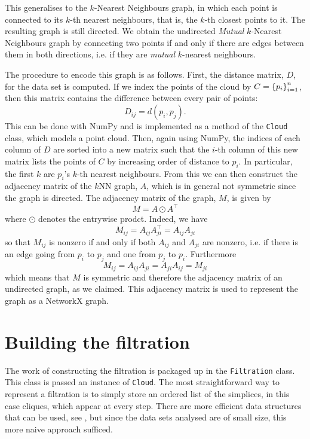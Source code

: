 \documentclass[../main.tex]{subfiles}
\begin{document}
This generalises to the \( k \)-Nearest Neighbours graph, in which each point is connected
to its \( k \)-th nearest neighbours, that is, the \( k \)-th closest points to it. The
resulting graph is still directed. We obtain the undirected \emph{Mutual} \( k \)-Nearest
Neighbours graph by connecting two points if and only if there are edges between them
in both directions, i.e. if they are \emph{mutual} \( k \)-nearest neighbours. 

The procedure to encode this graph is as follows. First, the distance matrix, \( D \), for
the data set is computed. If we index the points of the cloud by \( C = \left\{ p_i \right\}_{i =
1}^n \), then this matrix contains the difference between every pair of points:
\begin{equation*}
	D_{ij} = d(p_i, p_j). 
\end{equation*}
This can be done with \textsf{NumPy} and is implemented as a method of the \texttt{Cloud}
class, which models a point cloud. Then, again using \textsf{NumPy}, the indices of each
column of \( D \) are sorted into a new matrix such that the \( i \)-th column of this new
matrix lists the points of \( C \) by increasing order of distance to \( p_i \). In
particular, the first \( k \) are \( p_i \)'s \( k \)-th nearest neighbours. From this we
can then construct the adjacency matrix of the \( k \)NN graph, \( A \), which is in
general not symmetric since the graph is directed. The adjacency matrix of the \MKNN
graph, \( M \), is given by
\begin{equation*}
	M = A \odot A^\top
\end{equation*}
where \( \odot \) denotes the entrywise prodct. Indeed, we have
\begin{equation*}
	M_{ij} = A_{ij}A^\top_{ji} = A_{ij}A_{ji}
\end{equation*}
so that \( M_{ij} \) is nonzero if and only if both \( A_{ij} \) and \( A_{ji} \) are
nonzero, i.e. if there is an edge going from \( p_i \) to \( p_j \) and one from \( p_j	\) to \( p_i \). Furthermore 
\begin{equation*}
	M_{ij} = A_{ij}A_{ji} = A_{ji}A_{ij} = M_{ji}
\end{equation*}
which means that \( M \) is symmetric and therefore the adjacency matrix of an undirected
graph, as we claimed. This adjacency matrix is used to represent the \MKNN graph as a
\textsf{NetworkX} graph. 

\section{Building the filtration}
The work of constructing the filtration is packaged up in the \texttt{Filtration} class.
This class is passed an instance of \texttt{Cloud}. The most straightforward way to
represent a filtration is to simply store an ordered list of the simplices, in this case cliques,
which appear at every step. There are more efficient data structures that can be used, see
, but since the data sets analysed are of small size, this more naive approach sufficed. 
\end{document}
